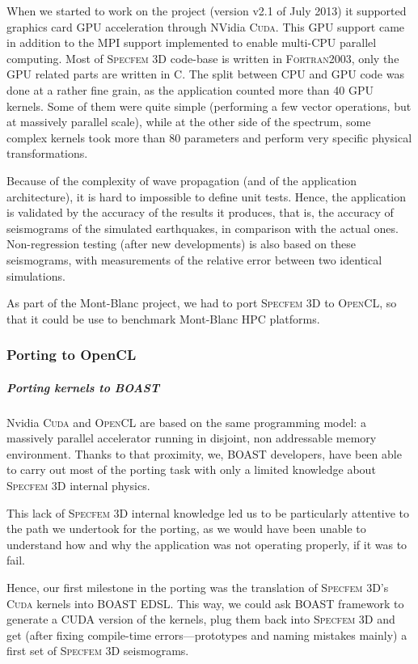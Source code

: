 \documentclass[11pt, a4paper, twoside]{montblanc}
\newcommand{\productname}[1]{\textsc{#1}}
\newcommand{\Specfem}{\productname{Specfem 3D}\xspace}
\newcommand{\Cuda}{\productname{Cuda}\xspace}
\newcommand{\OCL}{\productname{OpenCL}\xspace}
\begin{document}
When we started to work on the project (version v2.1 of July 2013) it
supported graphics card GPU acceleration through NVidia \Cuda. This
GPU support came in addition to the MPI support implemented to enable
multi-CPU parallel computing. Most of \Specfem code-base is written in
\productname{Fortran2003}, only the GPU related parts are written in
C.  The split between CPU and GPU code was done at a rather fine
grain, as the application counted more than 40 GPU kernels. Some of
them were quite simple (\eg performing a few vector operations, but at
massively parallel scale), while at the other side of the spectrum,
some complex kernels took more than 80 parameters and perform very
specific physical transformations.

Because of the complexity of wave propagation (and of the application
architecture), it is hard to impossible to define unit tests. Hence,
the application is validated by the accuracy of the results it
produces, that is, the accuracy of seismograms of the simulated
earthquakes, in comparison with the actual ones. Non-regression
testing (after new developments) is also based on these seismograms,
with measurements of the relative error between two identical
simulations.

As part of the Mont-Blanc project, we had to port \Specfem to \OCL, so
that it could be use to benchmark Mont-Blanc HPC platforms.

\subsubsection{Porting to OpenCL}

\subparagraph{Porting kernels to BOAST} 

Nvidia \Cuda and \OCL are based on the same programming model: a
massively parallel accelerator running in disjoint, non addressable
memory environment. Thanks to that proximity, we, BOAST developers,
have been able to carry out most of the porting task with only a
limited knowledge about \Specfem internal physics.

This lack of \Specfem internal knowledge led us to be particularly
attentive to the path we undertook for the porting, as we would have
been unable to understand how and why the application was not
operating properly, if it was to fail.

Hence, our first milestone in the porting was the translation of
\Specfem's \Cuda kernels into BOAST EDSL. This way, we could ask BOAST
framework to generate a CUDA version of the kernels, plug them back
into \Specfem and get (after fixing compile-time errors---prototypes
and naming mistakes mainly) a first set of \Specfem seismograms.
\end{document}
